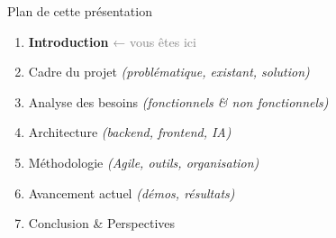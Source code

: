 \documentclass[aspectratio=169]{beamer}
\begin{document}
\begin{frame}{Plan de cette présentation}
  \begin{enumerate}
    \setlength\itemsep{0.5em}
    \item[\textbf{1.}] \textbf{Introduction} \hfill \textcolor{gray}{\small ← vous êtes ici}
    \item[\textbf{2.}] Cadre du projet \textit{(problématique, existant, solution)}
    \item[\textbf{3.}] Analyse des besoins \textit{(fonctionnels \& non fonctionnels)}
    \item[\textbf{4.}] Architecture \textit{(backend, frontend, IA)}
    \item[\textbf{5.}] Méthodologie \textit{(Agile, outils, organisation)}
    \item[\textbf{6.}] Avancement actuel \textit{(démos, résultats)}
    \item[\textbf{7.}] Conclusion \& Perspectives
  \end{enumerate}
\end{frame}

\end{document}
